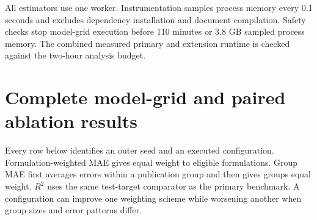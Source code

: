 \documentclass[11pt]{article}
\begin{document}
All estimators use one worker. Instrumentation samples process memory every 0.1 seconds and excludes dependency installation and document compilation. Safety checks stop model-grid execution before 110 minutes or 3.8 GB sampled process memory. The combined measured primary and extension runtime is checked against the two-hour analysis budget.

\section{Complete model-grid and paired ablation results}
Every row below identifies an outer seed and an executed configuration. Formulation-weighted MAE gives equal weight to eligible formulations. Group MAE first averages errors within a publication group and then gives groups equal weight. \(R^2\) uses the same test-target comparator as the primary benchmark. A configuration can improve one weighting scheme while worsening another when group sizes and error patterns differ.
\end{document}
